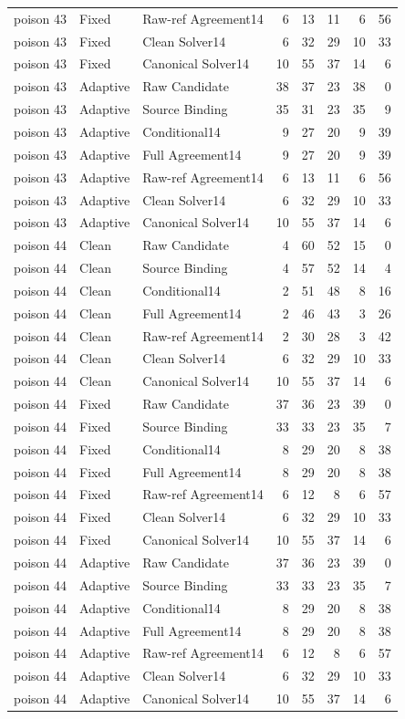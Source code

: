 \documentclass[journal,onecolumn]{IEEEtran}
\begin{document}
\begin{longtable}{@{}lllrrrrr@{}}
poison 43 & Fixed & Raw-ref Agreement14 & 6 & 13 & 11 & 6 & 56\\
poison 43 & Fixed & Clean Solver14 & 6 & 32 & 29 & 10 & 33\\
poison 43 & Fixed & Canonical Solver14 & 10 & 55 & 37 & 14 & 6\\
poison 43 & Adaptive & Raw Candidate & 38 & 37 & 23 & 38 & 0\\
poison 43 & Adaptive & Source Binding & 35 & 31 & 23 & 35 & 9\\
poison 43 & Adaptive & Conditional14 & 9 & 27 & 20 & 9 & 39\\
poison 43 & Adaptive & Full Agreement14 & 9 & 27 & 20 & 9 & 39\\
poison 43 & Adaptive & Raw-ref Agreement14 & 6 & 13 & 11 & 6 & 56\\
poison 43 & Adaptive & Clean Solver14 & 6 & 32 & 29 & 10 & 33\\
poison 43 & Adaptive & Canonical Solver14 & 10 & 55 & 37 & 14 & 6\\
poison 44 & Clean & Raw Candidate & 4 & 60 & 52 & 15 & 0\\
poison 44 & Clean & Source Binding & 4 & 57 & 52 & 14 & 4\\
poison 44 & Clean & Conditional14 & 2 & 51 & 48 & 8 & 16\\
poison 44 & Clean & Full Agreement14 & 2 & 46 & 43 & 3 & 26\\
poison 44 & Clean & Raw-ref Agreement14 & 2 & 30 & 28 & 3 & 42\\
poison 44 & Clean & Clean Solver14 & 6 & 32 & 29 & 10 & 33\\
poison 44 & Clean & Canonical Solver14 & 10 & 55 & 37 & 14 & 6\\
poison 44 & Fixed & Raw Candidate & 37 & 36 & 23 & 39 & 0\\
poison 44 & Fixed & Source Binding & 33 & 33 & 23 & 35 & 7\\
poison 44 & Fixed & Conditional14 & 8 & 29 & 20 & 8 & 38\\
poison 44 & Fixed & Full Agreement14 & 8 & 29 & 20 & 8 & 38\\
poison 44 & Fixed & Raw-ref Agreement14 & 6 & 12 & 8 & 6 & 57\\
poison 44 & Fixed & Clean Solver14 & 6 & 32 & 29 & 10 & 33\\
poison 44 & Fixed & Canonical Solver14 & 10 & 55 & 37 & 14 & 6\\
poison 44 & Adaptive & Raw Candidate & 37 & 36 & 23 & 39 & 0\\
poison 44 & Adaptive & Source Binding & 33 & 33 & 23 & 35 & 7\\
poison 44 & Adaptive & Conditional14 & 8 & 29 & 20 & 8 & 38\\
poison 44 & Adaptive & Full Agreement14 & 8 & 29 & 20 & 8 & 38\\
poison 44 & Adaptive & Raw-ref Agreement14 & 6 & 12 & 8 & 6 & 57\\
poison 44 & Adaptive & Clean Solver14 & 6 & 32 & 29 & 10 & 33\\
poison 44 & Adaptive & Canonical Solver14 & 10 & 55 & 37 & 14 & 6\\
\end{longtable}\endgroup
\end{document}

